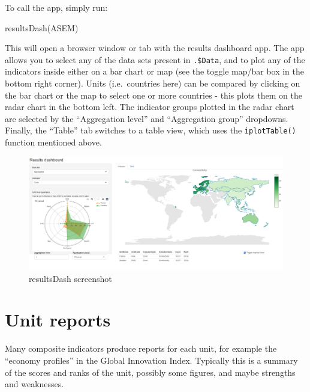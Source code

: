 \documentclass[
]{book}
\newenvironment{Shaded}{\begin{snugshade}}{\end{snugshade}}
\newcommand{\FunctionTok}[1]{\textcolor[rgb]{0.00,0.00,0.00}{#1}}
\newcommand{\NormalTok}[1]{#1}
\begin{document}
To call the app, simply run:

\begin{Shaded}
\begin{Highlighting}[]
\FunctionTok{resultsDash}\NormalTok{(ASEM)}
\end{Highlighting}
\end{Shaded}

This will open a browser window or tab with the results dashboard app. The app allows you to select any of the data sets present in \texttt{.\$Data}, and to plot any of the indicators inside either on a bar chart or map (see the toggle map/bar box in the bottom right corner). Units (i.e.~countries here) can be compared by clicking on the bar chart or the map to select one or more countries - this plots them on the radar chart in the bottom left. The indicator groups plotted in the radar chart are selected by the ``Aggregation level'' and ``Aggregation group'' dropdowns. Finally, the ``Table'' tab switches to a table view, which uses the \texttt{iplotTable()} function mentioned above.

\begin{figure}

{\centering \includegraphics[width=1\linewidth]{images/resultsDash_screenshot} 

}

\caption{resultsDash screenshot}\label{fig:unnamed-chunk-75}
\end{figure}

\hypertarget{unit-reports}{%
\section{Unit reports}\label{unit-reports}}

Many composite indicators produce reports for each unit, for example the ``economy profiles'' in the Global Innovation Index. Typically this is a summary of the scores and ranks of the unit, possibly some figures, and maybe strengths and weaknesses.
\end{document}
